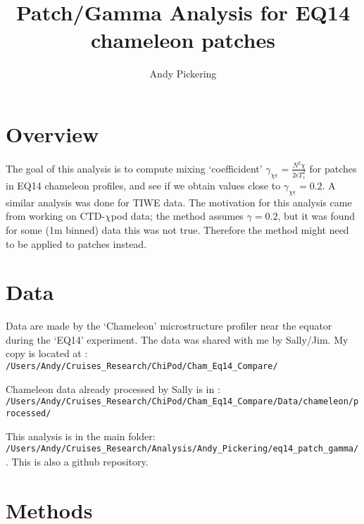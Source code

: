 \documentclass[11pt]{article}
\title{Patch/Gamma Analysis for EQ14 chameleon patches}
\author{Andy Pickering}
\begin{document}
\maketitle

\tableofcontents
\newpage

\section{Overview}

The goal of this analysis is to compute mixing `coefficident' $\gamma_{\chi\epsilon}=\frac{N^2 \chi}{2\epsilon T_{z}^{2}} $ for patches in EQ14 chameleon profiles, and see if we obtain values close to $\gamma_{\chi\epsilon}=0.2$. A similar analysis was done for TIWE data. The motivation for this analysis came from working on CTD-$\chi$pod data; the method assumes $\gamma=0.2$, but it was found for some (1m binned) data this was not true. Therefore the method might need to be applied to patches instead.

\section{Data}

Data are made by the `Chameleon' microstructure profiler near the equator during the `EQ14' experiment. The data was shared with me by Sally/Jim. My copy is located at : 
\medskip
\newline
\verb+/Users/Andy/Cruises_Research/ChiPod/Cham_Eq14_Compare/+
\medskip

Chameleon data already processed by Sally is in : \newline
\verb+/Users/Andy/Cruises_Research/ChiPod/Cham_Eq14_Compare/Data/chameleon/processed/+

\medskip

This analysis is in the main folder: \newline  \verb+/Users/Andy/Cruises_Research/Analysis/Andy_Pickering/eq14_patch_gamma/+ . This is also a github repository.






\section{Methods}
\end{document}
